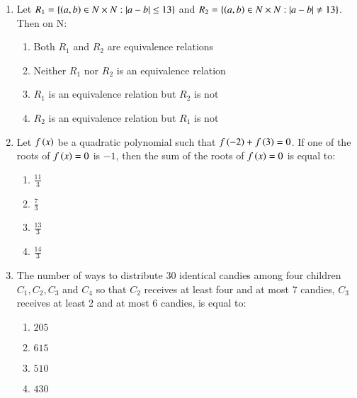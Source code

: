\documentclass[journal]{IEEEtran}
\begin{document}
\begin{enumerate}
\setcounter{enumi}{0}
 
    \item Let $R_1=\{\left(a,b\right)\in N\times N: \left\vert a-b\right\vert\leq13\}$ and $R_2=\{\left(a,b\right)\in N\times N: \left\vert a-b\right\vert\neq13\}$. Then on N:

        \begin{multicols}{2}
            \begin{enumerate}
                \item Both $R_1$ and $R_2$ are equivalence relations
                \item Neither $R_1$ nor $R_2$ is an equivalence relation
                \item $R_1$ is an equivalence relation but $R_2$ is not
                \item $R_2$ is an equivalence relation but $R_1$ is not
            \end{enumerate}
        \end{multicols}

    \item Let $f\left(x\right)$ be a quadratic polynomial such that $f\left(-2\right)+f\left(3\right)=0$. If one of the roots of $f\left(x\right)=0$ is $-1$, then the sum of the roots of $f\left(x\right)=0$ is equal to:

		\begin{multicols}{4}
			\begin{enumerate}
				\item $\frac{11}{3}$
				\item $\frac{7}{3}$
				\item $\frac{13}{3}$
				\item $\frac{14}{3}$
			\end{enumerate}
		\end{multicols}

    \item The number of ways to distribute 30 identical candies among four children $C_1,C_2,C_3$ and $C_4$ so that $C_2$ receives at least four and at most 7 candies, $C_3$ receives at least 2 and at most 6 candies, is equal to:

        \begin{multicols}{4}
            \begin{enumerate}
                \item $205$
                \item $615$
                \item $510$
                \item $430$
            \end{enumerate}
        \end{multicols}


\end{enumerate}
\end{document}
